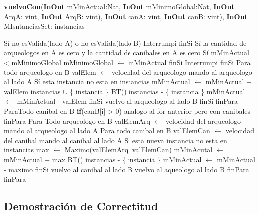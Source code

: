 \documentclass[spanish,12pt]{article}
\begin{document}
\begin{algorithm}[H]{\textbf{vuelvoCon}(\textbf{InOut} mMinActual:Nat, \textbf{InOut} mMinimoGlobal:Nat, \textbf{InOut} ArqA: vint, \textbf{InOut} ArqB: vint), \textbf{InOut} canA: vint, \textbf{InOut} canB: vint), \textbf{InOut} MIsntanciasSet: instancias}
	\begin{algorithmic}
	\State Sí no esValida(lado A) o no esValida(lado B)
	\State \quad Interrumpi
	\State finSi
	\State Sí la cantidad de arqueologos en A es cero y la cantidad de canibales en A es cero
	\State \quad Sí mMinActual < mMinimoGlobal
	\State \qquad mMinimoGlobal $\gets$ mMinActual
	\State \quad finSi
	\State  \quad Interrumpi
	\State finSi
	\State Para todo arqueologo en B
	\State \qquad valElem $\gets$ velocidad del arqueologo
	\State \qquad mando al arqueologo al lado A
	\State \qquad Sí esta instancia no esta en instancias
	\State \qquad \quad mMinActual $\gets$ mMinActual + valElem
	\State \qquad \quad instancias $\cup$ \{ instancia \}
	\State \qquad \quad BT()
	\State \qquad \quad instancias - \{ instancia \}
	\State \qquad \quad mMinActual $\gets$ mMinActual - valElem
	\State \qquad finSi
	\State \qquad vuelvo al arqueologo al lado B
	\State \quad finSi
	\State finPara
	\State ParaTodo canibal en B
	\State \quad \textbf{if}(canB[i] > 0)
	\State \qquad analogo al for anterior pero con canibales
	\State finPara
	\State Para Todo arqueologo en B
	\State \quad valElemArq $\gets$ velocidad del arqueologo
	\State \qquad mando al arqueologo al lado A
	\State \qquad Para todo canibal en B
	\State \qquad \quad valElemCan $\gets$ velocidad del canibal
	\State \qquad \qquad mando al canibal al lado A
	\State \qquad \qquad Si esta nueva instancia no esta en instancias
	\State \qquad \qquad \quad max $\gets$ Maximo(valElemArq, valElemCan)
	\State \qquad \qquad \quad mMinAcutal $\gets$ mMinActual + max
	\State \qquad \qquad \quad BT()
	\State \qquad \qquad \quad instancias - \{ instancia \}
	\State \qquad \qquad \quad mMinActual $\gets$ mMinActual - maximo
	\State \qquad \qquad finSi
	\State \qquad \qquad vuelvo al canibal al lado B
	\State \qquad vuelvo al aqueologo al lado B
	\State \qquad finPara
	\State finPara

	\end{algorithmic}
\end{algorithm}


\subsection{Demostración de Correctitud}
\end{document}
